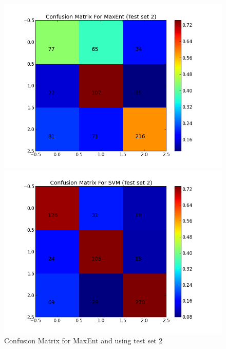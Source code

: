 \begin{figure}[htb]
	\centering
	\begin{minipage}{.45\linewidth}
		\includegraphics[width=\linewidth]{../img/plots/analysis/maxent_confusion_matrix_best_diff_test.png}
	\end{minipage}
	\hspace{0.05\linewidth}
	\begin{minipage}{.45\linewidth}
		\includegraphics[width=\linewidth]{../img/plots/analysis/svm_confusion_matrix_best_diff_test.png}
	\end{minipage}
	\caption[Confusion Matrix for MaxEnt and SVM using test set 2]{Confusion Matrix for MaxEnt and  using test set 2}
	\label{fig:best_result_confusion_testset2}
\end{figure}



